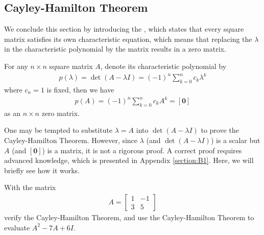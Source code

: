 \subsection{Cayley-Hamilton Theorem}
We conclude this section by introducing the , which states that every square matrix satisfies its own characteristic equation, which means that replacing the $\lambda$ in the characteristic polynomial by the matrix results in a zero matrix.
\begin{thm}
\label{thm:CHthmmat}
For any $n \times n$ square matrix $A$, denote its characteristic polynomial by
\begin{align}
p(\lambda) = \det(A-\lambda I) = (-1)^n \sum_{k=0}^{n} c_k \lambda^k
\end{align}
where $c_n = 1$ is fixed, then we have
\begin{align}
p(A) = (-1)^n \sum_{k=0}^{n} c_k A^k = [\textbf{0}]
\end{align}
as an $n \times n$ zero matrix.
\end{thm}
One may be tempted to substitute $\lambda = A$ into $\det(A-\lambda I)$ to prove the Cayley-Hamilton Theorem. However, since $\lambda$ (and $\det(A-\lambda I)$) is a scalar but $A$ (and $[\textbf{0}]$) is a matrix, it is not a rigorous proof. A correct proof requires advanced knowledge, which is presented in Appendix \ref{section:B1}. Here, we will briefly see how it works.
\begin{exmp}
With the matrix
\begin{align*}
A = 
\begin{bmatrix}
1 & -1 \\
3 & 5
\end{bmatrix}
\end{align*}
verify the Cayley-Hamilton Theorem, and use the Cayley-Hamilton Theorem to evaluate $A^2 - 7A + 6I$.
\end{exmp}
